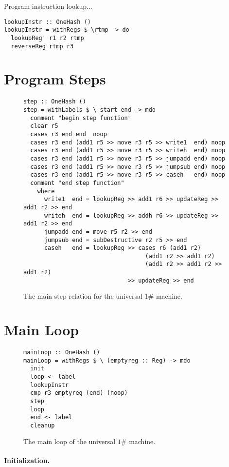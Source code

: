 \documentclass[10pt, preprint, nocopyrightspace]{sigplanconf}
\newcommand{\oh}{$1\#$\xspace}
\begin{document}
Program instruction lookup...

\begin{lstlisting}
lookupInstr :: OneHash ()
lookupInstr = withRegs $ \rtmp -> do
  lookupReg' r1 r2 rtmp
  reverseReg rtmp r3
\end{lstlisting}

\section{Program Steps}

\begin{figure*}
\begin{lstlisting}
step :: OneHash ()
step = withLabels $ \ start end -> mdo
  comment "begin step function"
  clear r5
  cases r3 end end  noop
  cases r3 end (add1 r5 >> move r3 r5 >> write1  end) noop
  cases r3 end (add1 r5 >> move r3 r5 >> writeh  end) noop
  cases r3 end (add1 r5 >> move r3 r5 >> jumpadd end) noop
  cases r3 end (add1 r5 >> move r3 r5 >> jumpsub end) noop
  cases r3 end (add1 r5 >> move r3 r5 >> caseh   end) noop
  comment "end step function"
    where
      write1  end = lookupReg >> add1 r6 >> updateReg >> add1 r2 >> end
      writeh  end = lookupReg >> addh r6 >> updateReg >> add1 r2 >> end
      jumpadd end = move r5 r2 >> end
      jumpsub end = subDestructive r2 r5 >> end
      caseh   end = lookupReg >> cases r6 (add1 r2)
                                   (add1 r2 >> add1 r2)
                                   (add1 r2 >> add1 r2 >> add1 r2)
                              >> updateReg >> end
\end{lstlisting}
\caption{The main step relation for the universal \oh machine.}
\end{figure*}

\section{Main Loop}

\begin{figure}
\begin{lstlisting}
mainLoop :: OneHash ()
mainLoop = withRegs $ \ (emptyreg :: Reg) -> mdo
  init
  loop <- label
  lookupInstr
  cmp r3 emptyreg (end) (noop)
  step
  loop
  end <- label
  cleanup
\end{lstlisting}
\caption{The main loop of the universal \oh machine.}
\end{figure}

\paragraph{Initialization.}
\end{document}
